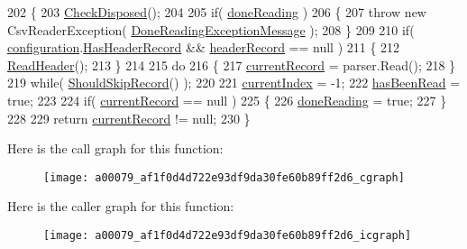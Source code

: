 \begin{DoxyCode}
202         \{
203             \hyperlink{a00079_a6fa45a46ed1322dc1872ca2321b5edbc}{CheckDisposed}();
204 
205             \textcolor{keywordflow}{if}( \hyperlink{a00079_a04a4a668ae50f5383cdd2a1691bbd718}{doneReading} )
206             \{
207                 \textcolor{keywordflow}{throw} \textcolor{keyword}{new} CsvReaderException( \hyperlink{a00079_abea2bd0359f517019984de31f9d9fb96}{DoneReadingExceptionMessage} );
208             \}
209 
210             \textcolor{keywordflow}{if}( \hyperlink{a00079_a695622911e45cbac8d67dcbd9a3e2967}{configuration}.\hyperlink{a00065_a9e439f90bfac500d24d6e2e731240439}{HasHeaderRecord} && 
      \hyperlink{a00079_aa6e5fd8aa2961442ca1caf7a4ac54d65}{headerRecord} == null )
211             \{
212                 \hyperlink{a00079_a57ba5fa523de97bd2cf068973329090d}{ReadHeader}();
213             \}
214 
215             \textcolor{keywordflow}{do}
216             \{
217                 \hyperlink{a00079_ab2bfef15784add66e441c9d3a0d73751}{currentRecord} = parser.Read();
218             \} 
219             \textcolor{keywordflow}{while}( \hyperlink{a00079_a3b8db0163b61e20d56ed8626e21338d6}{ShouldSkipRecord}() );
220 
221             \hyperlink{a00079_a56e974bc7e2242912e956393e831e166}{currentIndex} = -1;
222             \hyperlink{a00079_a34d0725235d140229f6a07e4c3b83552}{hasBeenRead} = \textcolor{keyword}{true};
223 
224             \textcolor{keywordflow}{if}( \hyperlink{a00079_ab2bfef15784add66e441c9d3a0d73751}{currentRecord} == null )
225             \{
226                 \hyperlink{a00079_a04a4a668ae50f5383cdd2a1691bbd718}{doneReading} = \textcolor{keyword}{true};
227             \}
228 
229             \textcolor{keywordflow}{return} \hyperlink{a00079_ab2bfef15784add66e441c9d3a0d73751}{currentRecord} != null;
230         \}
\end{DoxyCode}


Here is the call graph for this function\-:
\nopagebreak
\begin{figure}[H]
\begin{center}
\leavevmode
\texttt{[image: a00079\_af1f0d4d722e93df9da30fe60b89ff2d6\_cgraph]}
\end{center}
\end{figure}




Here is the caller graph for this function\-:
\nopagebreak
\begin{figure}[H]
\begin{center}
\leavevmode
\texttt{[image: a00079\_af1f0d4d722e93df9da30fe60b89ff2d6\_icgraph]}
\end{center}
\end{figure}


